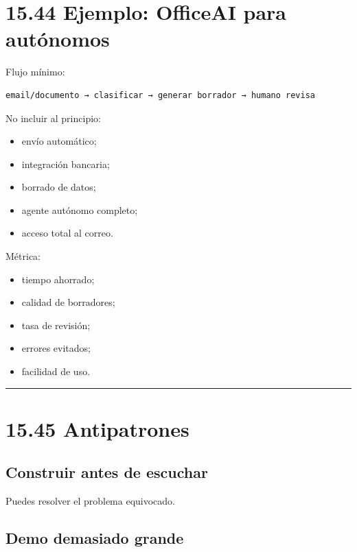 \section{15.44 Ejemplo: OfficeAI para
autónomos}\label{ejemplo-officeai-para-autuxf3nomos}

Flujo mínimo:

\begin{lstlisting}
email/documento → clasificar → generar borrador → humano revisa
\end{lstlisting}

No incluir al principio:

\begin{itemize}
\tightlist
\item
  envío automático;
\item
  integración bancaria;
\item
  borrado de datos;
\item
  agente autónomo completo;
\item
  acceso total al correo.
\end{itemize}

Métrica:

\begin{itemize}
\tightlist
\item
  tiempo ahorrado;
\item
  calidad de borradores;
\item
  tasa de revisión;
\item
  errores evitados;
\item
  facilidad de uso.
\end{itemize}

\begin{center}\rule{0.5\linewidth}{0.5pt}\end{center}

\section{15.45 Antipatrones}\label{antipatrones-4}

\subsection{Construir antes de
escuchar}\label{construir-antes-de-escuchar}

Puedes resolver el problema equivocado.

\subsection{Demo demasiado grande}\label{demo-demasiado-grande}

